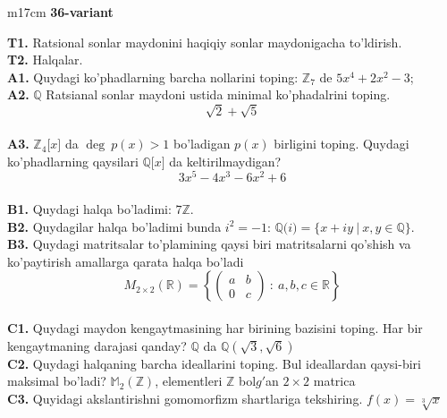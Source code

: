 \documentclass{article}
\begin{document}
\begin{tabular}{m{17cm}}
\textbf{36-variant}
\newline

\textbf{T1.} Ratsional sonlar maydonini haqiqiy sonlar maydonigacha to'ldirish. \\
\textbf{T2.} Halqalar. \\
\textbf{A1.} Quydagi ko'phadlarning barcha nollarini toping:
\(\mathbb{Z}_{7}\) de \(5x^{4} + 2x^{2} - 3\); \\
\textbf{A2.} \(\mathbb{Q}\) Ratsianal sonlar maydoni ustida minimal ko'phadalrini toping.
\[\sqrt{2} + \sqrt{5}\] \\
\textbf{A3.} \(\mathbb{Z}_{4}\lbrack x\rbrack\) da \(\deg\ p(x) > 1\) bo'ladigan \(p(x)\) birligini toping. Quydagi ko'phadlarning qaysilari \(\mathbb{Q\lbrack}x\rbrack\) da keltirilmaydigan?
\[3x^{5} - 4x^{3} - 6x^{2} + 6\] \\
\textbf{B1.} Quydagi halqa bo'ladimi:
\(7\mathbb{Z}\). \\
\textbf{B2.} Quydagilar halqa bo'ladimi bunda \(i^{2} = - 1\):
\(\mathbb{Q(}i) = \{ x + iy\ |\ x,y \in \mathbb{Q\}}\). \\
\textbf{B3.} Quydagi matritsalar to'plamining qaysi biri matritsalarni qo'shish va ko'paytirish amallarga qarata halqa bo'ladi
\[M_{2 \times 2}\mathbb{(R) =}\left\{ \begin{pmatrix}
a & b \\
0 & c
\end{pmatrix}\ :\ a,b,c \in \mathbb{R} \right\}\] \\
\textbf{C1.} Quydagi maydon kengaytmasining har birining bazisini toping. Har bir kengaytmaning darajasi qanday?
\(\mathbb{Q}\) da \(\mathbb{Q}\left( \sqrt{3},\sqrt{6} \right)\) \\
\textbf{C2.} Quydagi halqaning barcha ideallarini toping. Bul ideallardan qaysi-biri maksimal bo'ladi?
\(\mathbb{M}_{2}\left( \mathbb{Z} \right)\), elementleri \(\mathbb{Z}\) bol\(g'\)an \(2 \times 2\) matrica \\
\textbf{C3.} Quyidagi akslantirishni gomomorfizm shartlariga tekshiring. \(f(x) = \sqrt[3]{x}\) \\

\end{tabular}
\vspace{1cm}
\end{document}
